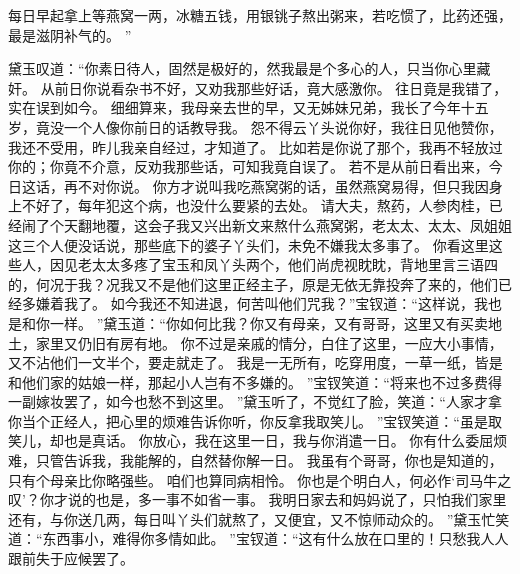 每日早起拿上等燕窝一两，冰糖五钱，用银铫子熬出粥来，若吃惯了，比药还强，最是滋阴补气的。
”\par
黛玉叹道：“你素日待人，固然是极好的，然我最是个多心的人，只当你心里藏奸。
从前日你说看杂书不好，又劝我那些好话，竟大感激你。
往日竟是我错了，实在误到如今。
细细算来，我母亲去世的早，又无姊妹兄弟，我长了今年十五岁，竟没一个人像你前日的话教导我。
怨不得云丫头说你好，我往日见他赞你，我还不受用，昨儿我亲自经过，才知道了。
比如若是你说了那个，我再不轻放过你的；你竟不介意，反劝我那些话，可知我竟自误了。
若不是从前日看出来，今日这话，再不对你说。
你方才说叫我吃燕窝粥的话，虽然燕窝易得，但只我因身上不好了，每年犯这个病，也没什么要紧的去处。
请大夫，熬药，人参肉桂，已经闹了个天翻地覆，这会子我又兴出新文来熬什么燕窝粥，老太太、太太、凤姐姐这三个人便没话说，那些底下的婆子丫头们，未免不嫌我太多事了。
你看这里这些人，因见老太太多疼了宝玉和凤丫头两个，他们尚虎视眈眈，背地里言三语四的，何况于我？况我又不是他们这里正经主子，原是无依无靠投奔了来的，他们已经多嫌着我了。
如今我还不知进退，何苦叫他们咒我？”宝钗道：“这样说，我也是和你一样。
”黛玉道：“你如何比我？你又有母亲，又有哥哥，这里又有买卖地土，家里又仍旧有房有地。
你不过是亲戚的情分，白住了这里，一应大小事情，又不沾他们一文半个，要走就走了。
我是一无所有，吃穿用度，一草一纸，皆是和他们家的姑娘一样，那起小人岂有不多嫌的。
”宝钗笑道：“将来也不过多费得一副嫁妆罢了，如今也愁不到这里。
”黛玉听了，不觉红了脸，笑道：“人家才拿你当个正经人，把心里的烦难告诉你听，你反拿我取笑儿。
”宝钗笑道：“虽是取笑儿，却也是真话。
你放心，我在这里一日，我与你消遣一日。
你有什么委屈烦难，只管告诉我，我能解的，自然替你解一日。
我虽有个哥哥，你也是知道的，只有个母亲比你略强些。
咱们也算同病相怜。
你也是个明白人，何必作‘司马牛之叹’？你才说的也是，多一事不如省一事。
我明日家去和妈妈说了，只怕我们家里还有，与你送几两，每日叫丫头们就熬了，又便宜，又不惊师动众的。
”黛玉忙笑道：“东西事小，难得你多情如此。
”宝钗道：“这有什么放在口里的！只愁我人人跟前失于应候罢了。

